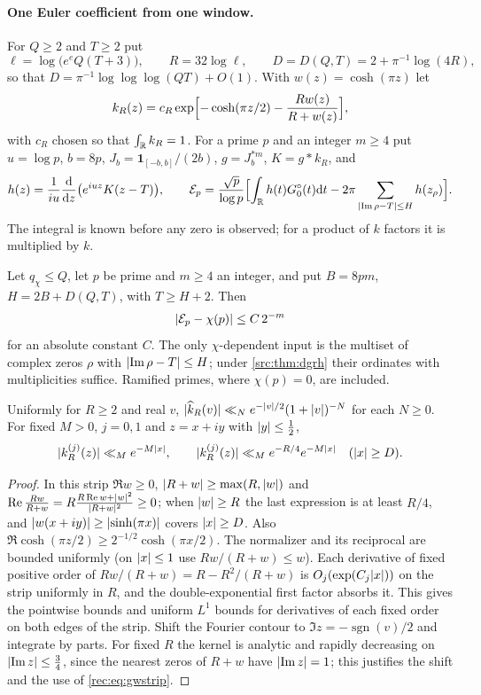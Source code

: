 \paragraph{One Euler coefficient from one window.}
For $Q\ge2$ and $T\ge2$ put
\[
 \ell=\log\bigl(e^eQ(T+3)\bigr),\qquad R=32\log\ell,\qquad D=D(Q,T)=2+\pi^{-1}\log(4R),
\]
so that $D=\pi^{-1}\log\log\log(QT)+O(1)$. With $w(z)=\cosh(\pi z)$ let
\[
 k_R(z)=c_R\exp\Bigl[-\cosh(\pi z/2)-\frac{Rw(z)}{R+w(z)}\Bigr],
\]
with $c_R$ chosen so that $\int_{\mathbb{R}} k_R=1$. For a prime $p$ and an integer $m\ge4$ put $u=\log p$,
$b=8p$, $J_b=\mathbf 1_{[-b,b]}/(2b)$, $g=J_b^{*m}$, $K=g*k_R$, and
\[
 h(z)=\frac1{iu}\frac{\mathrm{d}}{\mathrm{d} z}\bigl(e^{iuz}K(z-T)\bigr),\qquad
 \mathcal E_p=\frac{\sqrt p}{\log p}\Bigl[\int_{\mathbb{R}} h(t)G_0^\circ(t)\mathrm{d} t-2\pi\sum_{\lvert\operatorname{Im}\rho-T\rvert\le H}h(z_\rho)\Bigr].
\]
The integral is known before any zero is observed; for a product of $k$ factors it is multiplied
by $k$.

\begin{theorem}\label{rec:thm:localcoeff}
Let $q_\chi\le Q$, let $p$ be prime and $m\ge4$ an integer, and put $B=8pm$, $H=2B+D(Q,T)$, with
$T\ge H+2$. Then
\[
 \lvert\mathcal E_p-\chi(p)\rvert\le C\,2^{-m}
\]
for an absolute constant $C$. The only $\chi$-dependent input is the multiset of complex zeros
$\rho$ with $\lvert\operatorname{Im}\rho-T\rvert\le H$; under \cref{src:thm:dgrh} their ordinates with multiplicities
suffice. Ramified primes, where $\chi(p)=0$, are included.
\end{theorem}

\begin{lemma}\label{rec:lem:lekernel}
Uniformly for $R\ge2$ and real $v$, $\lvert\widehat k_R(v)\rvert\ll_Ne^{-\lvert v\rvert/2}(1+\lvert v\rvert)^{-N}$ for each
$N\ge0$. For fixed $M>0$, $j=0,1$ and $z=x+iy$ with $\lvert y\rvert\le\tfrac12$,
\[
 \lvert k_R^{(j)}(z)\rvert\ll_Me^{-M\lvert x\rvert},\qquad \lvert k_R^{(j)}(z)\rvert\ll_Me^{-R/4}e^{-M\lvert x\rvert}\quad(\lvert x\rvert\ge D).
\]
\end{lemma}

\begin{proof}
In this strip $\Re w\ge0$, $\lvert R+w\rvert\ge\max(R,\lvert w\rvert)$ and
$\operatorname{Re}\frac{Rw}{R+w}=R\frac{R\operatorname{Re} w+\lvert w\rvert^2}{\lvert R+w\rvert^2}\ge0$; when $\lvert w\rvert\ge R$ the last expression is at
least $R/4$, and $\lvert w(x+iy)\rvert\ge\lvert\sinh(\pi x)\rvert$ covers $\lvert x\rvert\ge D$. Also
$\Re\cosh(\pi z/2)\ge2^{-1/2}\cosh(\pi x/2)$. The normalizer and its reciprocal are bounded
uniformly (on $\lvert x\rvert\le1$ use $Rw/(R+w)\le w$). Each derivative of fixed positive order of
$Rw/(R+w)=R-R^2/(R+w)$ is $O_j(\exp(C_j\lvert x\rvert))$ on the strip uniformly in $R$, and the
double-exponential first factor absorbs it. This gives the pointwise bounds and uniform $L^1$
bounds for derivatives of each fixed order on both edges of the strip. Shift the Fourier
contour to $\Im z=-\operatorname{sgn}(v)/2$ and integrate by parts. For fixed $R$ the kernel is
analytic and rapidly decreasing on $\lvert\operatorname{Im} z\rvert\le\tfrac34$, since the nearest zeros of $R+w$ have
$\lvert\operatorname{Im} z\rvert=1$; this justifies the shift and the use of \eqref{rec:eq:gwstrip}.
\end{proof}

